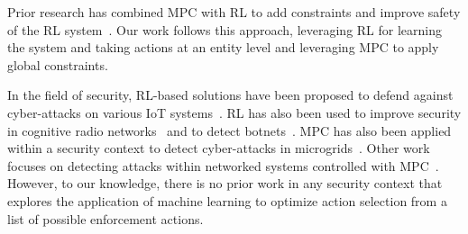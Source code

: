 Prior research has combined MPC with RL to add constraints and improve safety of the RL system~\cite{arroyo2022reinforced,zanon2020safe}. Our work follows this approach, leveraging RL for learning the system and taking actions at an entity level and leveraging MPC to apply global constraints.

In the field of security, RL-based solutions have been proposed to defend against cyber-attacks on various IoT systems~\cite{uprety2020reinforcement}. RL has also been used to improve security in cognitive radio networks~\cite{ling2015application} and to detect botnets~\cite{alauthman2020efficient}. MPC has also been applied within a security context to detect cyber-attacks in microgrids~\cite{habibi2021secure}. Other work focuses on detecting attacks within networked systems controlled with MPC~\cite{barboni2018model}. However, to our knowledge, there is no prior work in any security context that explores the application of machine learning to optimize action selection from a list of possible enforcement actions.
